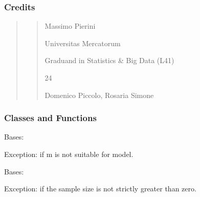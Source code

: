 \documentclass[letterpaper,10pt,english]{sphinxmanual}
\begin{document}
\subsubsection{Credits}
\label{\detokenize{cubmods:id717}}\begin{quote}
\begin{quote}\begin{description}
\sphinxAtStartPar
Massimo Pierini

\sphinxAtStartPar
Universitas Mercatorum

\sphinxAtStartPar
Graduand in Statistics \& Big Data (L41)

\sphinxhyphen{}24

\sphinxAtStartPar
Domenico Piccolo, Rosaria Simone

\sphinxAtStartPar
{}

\end{description}\end{quote}
\end{quote}


\subsubsection{Classes and Functions}
\label{\detokenize{cubmods:id718}}

\begin{fulllineitems}
\label{\detokenize{cubmods:cubmods.general.InvalidCategoriesError}}
\pysigstartsignatures
{}
\pysigstopsignatures
\sphinxAtStartPar
Bases: 

\sphinxAtStartPar
Exception: if m is not suitable for model.

\end{fulllineitems}


\begin{fulllineitems}
\label{\detokenize{cubmods:cubmods.general.InvalidSampleSizeError}}
\pysigstartsignatures
{}
\pysigstopsignatures
\sphinxAtStartPar
Bases: 

\sphinxAtStartPar
Exception: if the sample size is not strictly greater than zero.

\end{fulllineitems}
\end{document}
